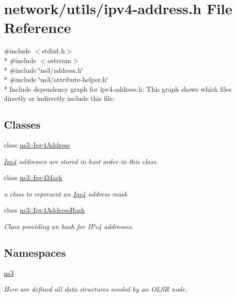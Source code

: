 \hypertarget{ipv4-address_8h}{}\section{network/utils/ipv4-\/address.h File Reference}
\label{ipv4-address_8h}
{\ttfamily \#include $<$stdint.\+h$>$}\\*
{\ttfamily \#include $<$ostream$>$}\\*
{\ttfamily \#include \char`\"{}ns3/address.\+h\char`\"{}}\\*
{\ttfamily \#include \char`\"{}ns3/attribute-\/helper.\+h\char`\"{}}\\*
Include dependency graph for ipv4-\/address.h\+:
This graph shows which files directly or indirectly include this file\+:
\subsection*{Classes}
\begin{DoxyCompactItemize}
\item 
class \hyperlink{classns3_1_1Ipv4Address}{ns3\+::\+Ipv4\+Address}
\begin{DoxyCompactList}\small\item\em \hyperlink{classns3_1_1Ipv4}{Ipv4} addresses are stored in host order in this class. \end{DoxyCompactList}\item 
class \hyperlink{classns3_1_1Ipv4Mask}{ns3\+::\+Ipv4\+Mask}
\begin{DoxyCompactList}\small\item\em a class to represent an \hyperlink{classns3_1_1Ipv4}{Ipv4} address mask \end{DoxyCompactList}\item 
class \hyperlink{classns3_1_1Ipv4AddressHash}{ns3\+::\+Ipv4\+Address\+Hash}
\begin{DoxyCompactList}\small\item\em Class providing an hash for I\+Pv4 addresses. \end{DoxyCompactList}\end{DoxyCompactItemize}
\subsection*{Namespaces}
\begin{DoxyCompactItemize}
\item 
 \hyperlink{namespacens3}{ns3}
\begin{DoxyCompactList}\small\item\em Here are defined all data structures needed by an O\+L\+SR node. \end{DoxyCompactList}\end{DoxyCompactItemize}
